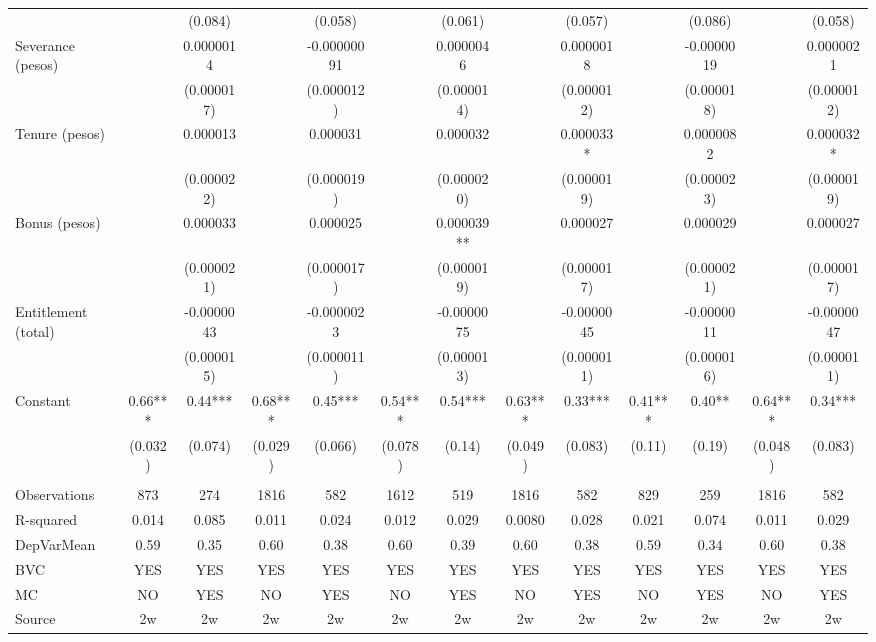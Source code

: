 \begin{tabular}{lcccccccccccc}
      &       & (0.084) &       & (0.058) &       & (0.061) &       & (0.057) &       & (0.086) &       & (0.058) \\
Severance (pesos) &       & 0.0000014 &       & -0.00000091 &       & 0.0000046 &       & 0.0000018 &       & -0.0000019 &       & 0.0000021 \\
      &       & (0.000017) &       & (0.000012) &       & (0.000014) &       & (0.000012) &       & (0.000018) &       & (0.000012) \\
Tenure (pesos) &       & 0.000013 &       & 0.000031 &       & 0.000032 &       & 0.000033* &       & 0.0000082 &       & 0.000032* \\
      &       & (0.000022) &       & (0.000019) &       & (0.000020) &       & (0.000019) &       & (0.000023) &       & (0.000019) \\
Bonus (pesos) &       & 0.000033 &       & 0.000025 &       & 0.000039** &       & 0.000027 &       & 0.000029 &       & 0.000027 \\
      &       & (0.000021) &       & (0.000017) &       & (0.000019) &       & (0.000017) &       & (0.000021) &       & (0.000017) \\
Entitlement (total) &       & -0.0000043 &       & -0.0000023 &       & -0.0000075 &       & -0.0000045 &       & -0.0000011 &       & -0.0000047 \\
      &       & (0.000015) &       & (0.000011) &       & (0.000013) &       & (0.000011) &       & (0.000016) &       & (0.000011) \\
Constant & 0.66*** & 0.44*** & 0.68*** & 0.45*** & 0.54*** & 0.54*** & 0.63*** & 0.33*** & 0.41*** & 0.40** & 0.64*** & 0.34*** \\
      & (0.032) & (0.074) & (0.029) & (0.066) & (0.078) & (0.14) & (0.049) & (0.083) & (0.11) & (0.19) & (0.048) & (0.083) \\
      &       &       &       &       &       &       &       &       &       &       &       &  \\
\midrule
Observations & 873   & 274   & 1816  & 582   & 1612  & 519   & 1816  & 582   & 829   & 259   & 1816  & 582 \\
R-squared & 0.014 & 0.085 & 0.011 & 0.024 & 0.012 & 0.029 & 0.0080 & 0.028 & 0.021 & 0.074 & 0.011 & 0.029 \\
DepVarMean & 0.59  & 0.35  & 0.60  & 0.38  & 0.60  & 0.39  & 0.60  & 0.38  & 0.59  & 0.34  & 0.60  & 0.38 \\
BVC   & YES   & YES   & YES   & YES   & YES   & YES   & YES   & YES   & YES   & YES   & YES   & YES \\
MC    & NO    & YES   & NO    & YES   & NO    & YES   & NO    & YES   & NO    & YES   & NO    & YES \\
Source & 2w    & 2w    & 2w    & 2w    & 2w    & 2w    & 2w    & 2w    & 2w    & 2w    & 2w    & 2w \\
\bottomrule
\bottomrule
\end{tabular}%
